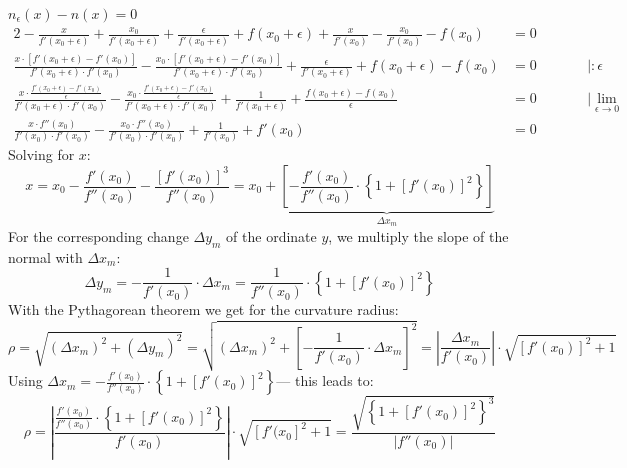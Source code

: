 \documentclass[11pt,english,BCOR=10mm,DIV=12,bibliography=totoc,parskip=false,headings=small,
    headinclude=false,footinclude=false,oneside]{pst-doc}
\newcommand{\envert}[1]{\left\lvert#1\right\rvert}
\let\abs=\envert
\begin{document}
 $n_{\epsilon}(x) - n(x) = 0$
\begin{alignat*}{2}
- \frac{x}{f'(x_{0}+\epsilon)} + \frac{x_{0}}{f'(x_{0}+\epsilon)} + \frac{\epsilon}{f'(x_{0}+\epsilon)} + f(x_{0}+\epsilon) + \frac{x}{f'(x_{0})} - \frac{x_{0}}{f'(x_{0})} - f(x_{0}) & = 0&\qquad& \\[4pt]
\frac{x\cdot \left[f'(x_{0}+\epsilon) - f'(x_{0})\right]}{f'(x_{0}+\epsilon)\cdot f'(x_{0})} - \frac{x_{0}\cdot \left[f'(x_{0}+\epsilon) - f'(x_{0})\right]}{f'(x_{0}+\epsilon)\cdot f'(x_{0})} + \frac{\epsilon}{f'(x_{0}+\epsilon)} + f(x_{0}+\epsilon) - f(x_{0}) & =
0&\qquad& |:\epsilon\\[4pt]
\frac{x\cdot \frac{f'(x_{0}+\epsilon) - f'(x_{0})}{\epsilon}}{f'(x_{0}+\epsilon)\cdot f'(x_{0})} - \frac{x_{0}\cdot \frac{f'(x_{0}+\epsilon) - f'(x_{0})}{\epsilon}}{f'(x_{0}+\epsilon)\cdot f'(x_{0})} + \frac{1}{f'(x_{0}+\epsilon)} + \frac{f(x_{0}+\epsilon) -
f(x_{0})}{\epsilon} & = 0&\qquad&| \lim_{\epsilon\to 0}\\[4pt]
\frac{x\cdot f''(x_{0})}{f'(x_{0})\cdot f'(x_{0})} - \frac{x_{0}\cdot f''(x_{0})}{f'(x_{0})\cdot f'(x_{0})} + \frac{1}{f'(x_{0})} + f'(x_{0}) & = 0&&
\end{alignat*}
Solving for $x$:
\begin{equation*}
 x = x_{0} - \frac{f'(x_{0})}{f''(x_{0})} - \frac{\left[f'(x_{0})\right]^{3}}{f''(x_{0})} = x_{0} + \underbrace{\left[-\frac{f'(x_{0})}{f''(x_{0})}\cdot \left\{ 1 + \left[f'(x_{0})\right]^{2} \right\}\right]}_{\Delta x_{m}}
\end{equation*}
For the corresponding change $\Delta y_{m}$ of the ordinate $y$, we multiply the slope of the normal with $\Delta x_{m}$:
\begin{equation*}
  \Delta y_{m} = -\frac{1}{f'(x_{0})} \cdot \Delta x_{m} =\frac{1}{f''(x_{0})}\cdot \left\{ 1 + \left[f'(x_{0})\right]^{2} \right\}
\end{equation*}
With the Pythagorean theorem we get for the curvature radius:
\begin{equation*}
  \rho = \sqrt{(\Delta x_{m})^{2} + (\Delta y_{m})^{2}} = \sqrt{(\Delta x_{m})^{2} + \left[-\frac{1}{f'(x_{0})} \cdot \Delta x_{m}\right]^{2}} = \abs{\frac{\Delta x_{m}}{f'(x_{0})}} \cdot \sqrt{\left[f'(x_{0})\right]^{2} + 1}
\end{equation*}
Using $\Delta x_{m} = -\frac{f'(x_{0})}{f''(x_{0})}\cdot \left\{ 1 + \left[f'(x_{0})\right]^{2} \right\}$--- this leads to:
\begin{equation*}
  \rho = \abs{\frac{\frac{f'(x_{0})}{f''(x_{0})}\cdot \left\{ 1 + \left[f'(x_{0})\right]^{2} \right\}}{f'(x_{0})}} \cdot \sqrt{\left[f'(x_{0}\right]^{2} + 1} =
  \frac{\sqrt{\left\{1 + \left[f'(x_{0})\right]^{2}\right\}^{3}}}{\abs{f''(x_{0})}}
\end{equation*}
\end{document}
